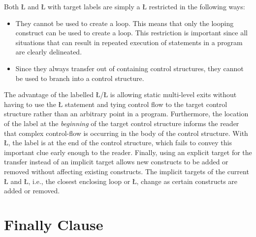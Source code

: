 \documentclass[openright,twoside]{report}
\begin{document}
Both \LGinlinetrue\LGbegin\lgrinde\L{}\endlgrinde\LGend{} and \LGinlinetrue\LGbegin\lgrinde\L{}\endlgrinde\LGend{} with target labels are simply a \LGinlinetrue\LGbegin\lgrinde\L{}\endlgrinde\LGend{} restricted in the following ways:
\begin{itemize}
\item
They cannot be used to create a loop.
This means that only the looping construct can be used to create a loop.
This restriction is important since all situations that can result in repeated execution of statements in a program are clearly delineated.
\item
Since they always transfer out of containing control structures, they cannot be used to branch into a control structure.
\end{itemize}
The advantage of the labelled \LGinlinetrue\LGbegin\lgrinde\L{}\endlgrinde\LGend{}/\LGinlinetrue\LGbegin\lgrinde\L{}\endlgrinde\LGend{} is allowing static multi-level exits without having to use the \LGinlinetrue\LGbegin\lgrinde\L{}\endlgrinde\LGend{} statement and tying control flow to the target control structure rather than an arbitrary point in a program.
Furthermore, the location of the label at the \emph{beginning} of the target control structure informs the reader that complex control-flow is occurring in the body of the control structure.
With \LGinlinetrue\LGbegin\lgrinde\L{}\endlgrinde\LGend{}, the label is at the end of the control structure, which fails to convey this important clue early enough to the reader.
Finally, using an explicit target for the transfer instead of an implicit target allows new constructs to be added or removed without affecting existing constructs.
The implicit targets of the current \LGinlinetrue\LGbegin\lgrinde\L{}\endlgrinde\LGend{} and \LGinlinetrue\LGbegin\lgrinde\L{}\endlgrinde\LGend{}, i.e., the closest enclosing loop or \LGinlinetrue\LGbegin\lgrinde\L{}\endlgrinde\LGend{}, change as certain constructs are added or removed.


\section{Finally Clause}
\label{s:FinallyClause}
\end{document}
